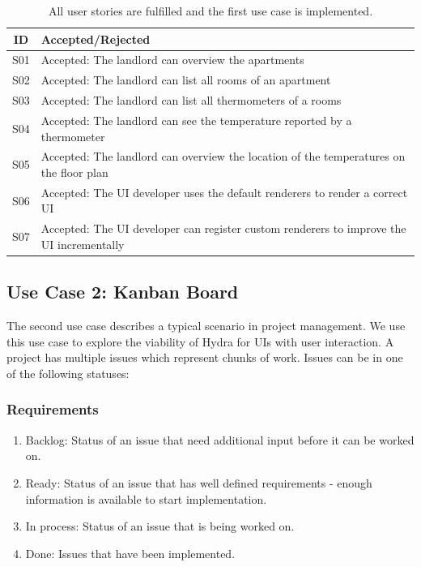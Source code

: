 \begin{table}
  \begin{center}
    \begin{tabular}{ |c|l| }
      \hline
      ID & Accepted/Rejected \\
      \hline
      S01 & Accepted: The landlord can overview the apartments \\
      S02 & Accepted: The landlord can list all rooms of an apartment \\
      S03 & Accepted: The landlord can list all thermometers of a rooms \\
      S04 & Accepted: The landlord can see the temperature reported by a thermometer \\
      S05 & Accepted: The landlord can overview the location of the temperatures on the floor plan \\
      S06 & Accepted: The UI developer uses the default renderers to render a correct UI \\
      S07 & Accepted: The UI developer can register custom renderers to improve the UI incrementally \\
      \hline
    \end{tabular}
    \caption{All user stories are fulfilled and the first use case is implemented.}
  \end{center}
\end{table}

\subsection{Use Case 2: Kanban Board}
The second use case describes a typical scenario in project management. We use this use case to explore the viability of Hydra for UIs with user interaction. A project has multiple issues which represent chunks of work. Issues can be in one of the following statuses:

\subsubsection{Requirements}

\begin{enumerate}
  \item Backlog: Status of an issue that need additional input before it can be worked on.
  \item Ready: Status of an issue that has well defined requirements - enough information is available to start implementation.
  \item In process: Status of an issue that is being worked on.
  \item Done: Issues that have been implemented.
\end{enumerate}

